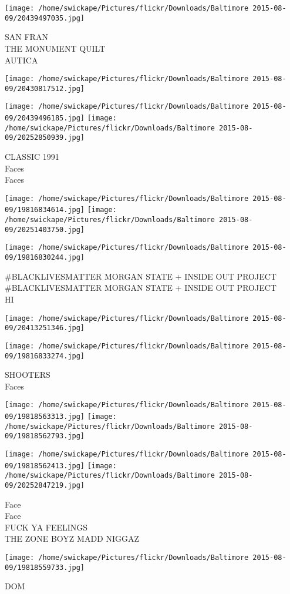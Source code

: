 \documentclass[10pt,letterpaper]{article}
\begin{document}
\texttt{[image: /home/swickape/Pictures/flickr/Downloads/Baltimore 2015-08-09/20439497035.jpg]}

SAN FRAN\\
THE MONUMENT QUILT\\
AUTICA
\pagebreak

\texttt{[image: /home/swickape/Pictures/flickr/Downloads/Baltimore 2015-08-09/20430817512.jpg]}

\vspace{0.25in}
\texttt{[image: /home/swickape/Pictures/flickr/Downloads/Baltimore 2015-08-09/20439496185.jpg]}
\texttt{[image: /home/swickape/Pictures/flickr/Downloads/Baltimore 2015-08-09/20252850939.jpg]}

CLASSIC 1991\\
Faces\\
Faces
\pagebreak

\texttt{[image: /home/swickape/Pictures/flickr/Downloads/Baltimore 2015-08-09/19816834614.jpg]}
\texttt{[image: /home/swickape/Pictures/flickr/Downloads/Baltimore 2015-08-09/20251403750.jpg]}

\vspace{0.25in}
\texttt{[image: /home/swickape/Pictures/flickr/Downloads/Baltimore 2015-08-09/19816830244.jpg]}

\#BLACKLIVESMATTER MORGAN STATE + INSIDE OUT PROJECT\\
\#BLACKLIVESMATTER MORGAN STATE + INSIDE OUT PROJECT\\
HI
\pagebreak

\texttt{[image: /home/swickape/Pictures/flickr/Downloads/Baltimore 2015-08-09/20413251346.jpg]}

\vspace{0.25in}
\texttt{[image: /home/swickape/Pictures/flickr/Downloads/Baltimore 2015-08-09/19816833274.jpg]}

SHOOTERS\\
Faces
\pagebreak

\texttt{[image: /home/swickape/Pictures/flickr/Downloads/Baltimore 2015-08-09/19818563313.jpg]}
\texttt{[image: /home/swickape/Pictures/flickr/Downloads/Baltimore 2015-08-09/19818562793.jpg]}

\texttt{[image: /home/swickape/Pictures/flickr/Downloads/Baltimore 2015-08-09/19818562413.jpg]}
\texttt{[image: /home/swickape/Pictures/flickr/Downloads/Baltimore 2015-08-09/20252847219.jpg]}

Face\\
Face\\
FUCK YA FEELINGS\\
THE ZONE BOYZ MADD NIGGAZ
\pagebreak

\texttt{[image: /home/swickape/Pictures/flickr/Downloads/Baltimore 2015-08-09/19818559733.jpg]}

DOM
\pagebreak
\end{document}
